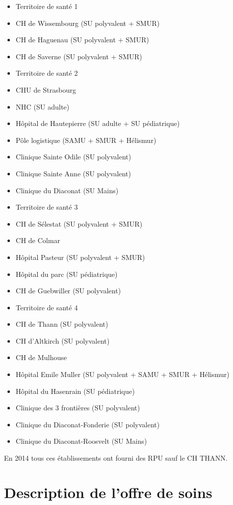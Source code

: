 \documentclass[]{article}
\begin{document}
\begin{itemize}
\item
  Territoire de santé 1
\item
  CH de Wissembourg (SU polyvalent + SMUR)
\item
  CH de Haguenau (SU polyvalent + SMUR)
\item
  CH de Saverne (SU polyvalent + SMUR)
\item
  Territoire de santé 2
\item
  CHU de Strasbourg
\item
  NHC (SU adulte)
\item
  Hôpital de Hautepierre (SU adulte + SU pédiatrique)
\item
  Pôle logistique (SAMU + SMUR + Hélismur)
\item
  Clinique Sainte Odile (SU polyvalent)
\item
  Clinique Sainte Anne (SU polyvalent)
\item
  Clinique du Diaconat (SU Mains)
\item
  Territoire de santé 3
\item
  CH de Sélestat (SU polyvalent + SMUR)
\item
  CH de Colmar
\item
  Hôpital Pasteur (SU polyvalent + SMUR)
\item
  Hôpital du parc (SU pédiatrique)
\item
  CH de Guebwiller (SU polyvalent)
\item
  Territoire de santé 4
\item
  CH de Thann (SU polyvalent)
\item
  CH d'Altkirch (SU polyvalent)
\item
  CH de Mulhouse
\item
  Hôpital Emile Muller (SU polyvalent + SAMU + SMUR + Hélismur)
\item
  Hôpital du Hasenrain (SU pédiatrique)
\item
  Clinique des 3 frontières (SU polyvalent)
\item
  Clinique du Diaconat-Fonderie (SU polyvalent)
\item
  Clinique du Diaconat-Roosvelt (SU Mains)
\end{itemize}

En 2014 tous ces établissements ont fourni des RPU sauf le CH THANN.

\section{Description de l'offre de
soins}\label{description-de-loffre-de-soins}
\end{document}
